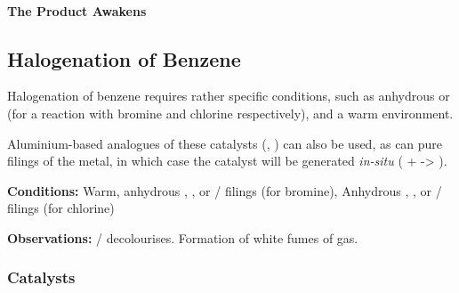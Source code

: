 			\paragraph{The Product Awakens}
















		\pagebreak
		\subsection{Halogenation of Benzene}

			Halogenation of benzene requires rather specific conditions, such as anhydrous  or  (for a reaction
			with bromine and chlorine respectively), and a warm environment.

			Aluminium-based analogues of these catalysts (, ) can also be used, as can pure
			filings of the metal, in which case the catalyst will be generated \textit{in-situ} ( +  -> ).


			\vspace{1.5em}
			\vbox{\textbf{Conditions:}	\tabto{35mm}Warm, anhydrous , , or  / \ch{\Al} filings (for bromine),
										\tabto{35mm}Anhydrous , , or
													 / \ch{\Al} filings (for chlorine)}

			\vspace{0.75em}
			\vbox{\textbf{Observations:}\tabto{35mm}  /   decolourises.
										\tabto{35mm}Formation of white fumes of  gas.}


			\hypertarget{BenzeneHalogenationCatalyst}{}
			\subsubsection{Catalysts}


